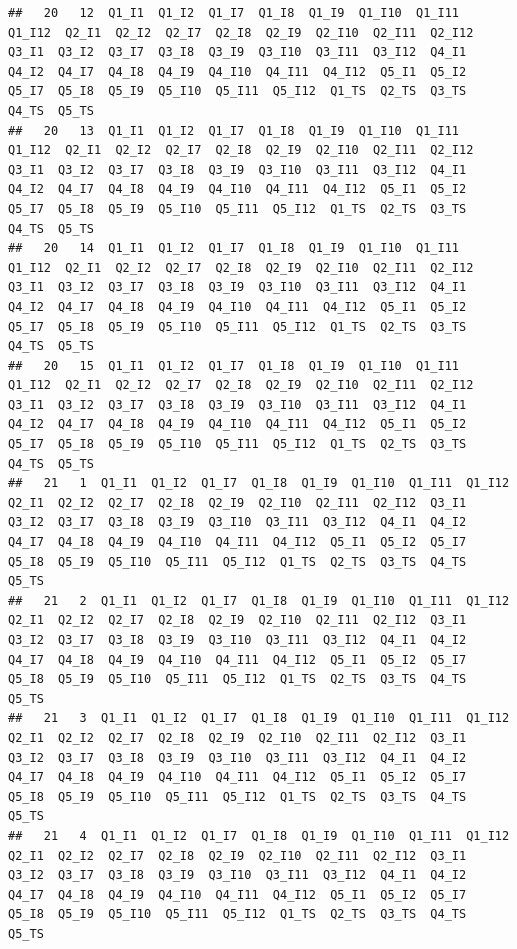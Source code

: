 \documentclass[
]{book}
\begin{document}
\begin{verbatim}
##   20   12  Q1_I1  Q1_I2  Q1_I7  Q1_I8  Q1_I9  Q1_I10  Q1_I11  Q1_I12  Q2_I1  Q2_I2  Q2_I7  Q2_I8  Q2_I9  Q2_I10  Q2_I11  Q2_I12  Q3_I1  Q3_I2  Q3_I7  Q3_I8  Q3_I9  Q3_I10  Q3_I11  Q3_I12  Q4_I1  Q4_I2  Q4_I7  Q4_I8  Q4_I9  Q4_I10  Q4_I11  Q4_I12  Q5_I1  Q5_I2  Q5_I7  Q5_I8  Q5_I9  Q5_I10  Q5_I11  Q5_I12  Q1_TS  Q2_TS  Q3_TS  Q4_TS  Q5_TS
##   20   13  Q1_I1  Q1_I2  Q1_I7  Q1_I8  Q1_I9  Q1_I10  Q1_I11  Q1_I12  Q2_I1  Q2_I2  Q2_I7  Q2_I8  Q2_I9  Q2_I10  Q2_I11  Q2_I12  Q3_I1  Q3_I2  Q3_I7  Q3_I8  Q3_I9  Q3_I10  Q3_I11  Q3_I12  Q4_I1  Q4_I2  Q4_I7  Q4_I8  Q4_I9  Q4_I10  Q4_I11  Q4_I12  Q5_I1  Q5_I2  Q5_I7  Q5_I8  Q5_I9  Q5_I10  Q5_I11  Q5_I12  Q1_TS  Q2_TS  Q3_TS  Q4_TS  Q5_TS
##   20   14  Q1_I1  Q1_I2  Q1_I7  Q1_I8  Q1_I9  Q1_I10  Q1_I11  Q1_I12  Q2_I1  Q2_I2  Q2_I7  Q2_I8  Q2_I9  Q2_I10  Q2_I11  Q2_I12  Q3_I1  Q3_I2  Q3_I7  Q3_I8  Q3_I9  Q3_I10  Q3_I11  Q3_I12  Q4_I1  Q4_I2  Q4_I7  Q4_I8  Q4_I9  Q4_I10  Q4_I11  Q4_I12  Q5_I1  Q5_I2  Q5_I7  Q5_I8  Q5_I9  Q5_I10  Q5_I11  Q5_I12  Q1_TS  Q2_TS  Q3_TS  Q4_TS  Q5_TS
##   20   15  Q1_I1  Q1_I2  Q1_I7  Q1_I8  Q1_I9  Q1_I10  Q1_I11  Q1_I12  Q2_I1  Q2_I2  Q2_I7  Q2_I8  Q2_I9  Q2_I10  Q2_I11  Q2_I12  Q3_I1  Q3_I2  Q3_I7  Q3_I8  Q3_I9  Q3_I10  Q3_I11  Q3_I12  Q4_I1  Q4_I2  Q4_I7  Q4_I8  Q4_I9  Q4_I10  Q4_I11  Q4_I12  Q5_I1  Q5_I2  Q5_I7  Q5_I8  Q5_I9  Q5_I10  Q5_I11  Q5_I12  Q1_TS  Q2_TS  Q3_TS  Q4_TS  Q5_TS
##   21   1  Q1_I1  Q1_I2  Q1_I7  Q1_I8  Q1_I9  Q1_I10  Q1_I11  Q1_I12  Q2_I1  Q2_I2  Q2_I7  Q2_I8  Q2_I9  Q2_I10  Q2_I11  Q2_I12  Q3_I1  Q3_I2  Q3_I7  Q3_I8  Q3_I9  Q3_I10  Q3_I11  Q3_I12  Q4_I1  Q4_I2  Q4_I7  Q4_I8  Q4_I9  Q4_I10  Q4_I11  Q4_I12  Q5_I1  Q5_I2  Q5_I7  Q5_I8  Q5_I9  Q5_I10  Q5_I11  Q5_I12  Q1_TS  Q2_TS  Q3_TS  Q4_TS  Q5_TS
##   21   2  Q1_I1  Q1_I2  Q1_I7  Q1_I8  Q1_I9  Q1_I10  Q1_I11  Q1_I12  Q2_I1  Q2_I2  Q2_I7  Q2_I8  Q2_I9  Q2_I10  Q2_I11  Q2_I12  Q3_I1  Q3_I2  Q3_I7  Q3_I8  Q3_I9  Q3_I10  Q3_I11  Q3_I12  Q4_I1  Q4_I2  Q4_I7  Q4_I8  Q4_I9  Q4_I10  Q4_I11  Q4_I12  Q5_I1  Q5_I2  Q5_I7  Q5_I8  Q5_I9  Q5_I10  Q5_I11  Q5_I12  Q1_TS  Q2_TS  Q3_TS  Q4_TS  Q5_TS
##   21   3  Q1_I1  Q1_I2  Q1_I7  Q1_I8  Q1_I9  Q1_I10  Q1_I11  Q1_I12  Q2_I1  Q2_I2  Q2_I7  Q2_I8  Q2_I9  Q2_I10  Q2_I11  Q2_I12  Q3_I1  Q3_I2  Q3_I7  Q3_I8  Q3_I9  Q3_I10  Q3_I11  Q3_I12  Q4_I1  Q4_I2  Q4_I7  Q4_I8  Q4_I9  Q4_I10  Q4_I11  Q4_I12  Q5_I1  Q5_I2  Q5_I7  Q5_I8  Q5_I9  Q5_I10  Q5_I11  Q5_I12  Q1_TS  Q2_TS  Q3_TS  Q4_TS  Q5_TS
##   21   4  Q1_I1  Q1_I2  Q1_I7  Q1_I8  Q1_I9  Q1_I10  Q1_I11  Q1_I12  Q2_I1  Q2_I2  Q2_I7  Q2_I8  Q2_I9  Q2_I10  Q2_I11  Q2_I12  Q3_I1  Q3_I2  Q3_I7  Q3_I8  Q3_I9  Q3_I10  Q3_I11  Q3_I12  Q4_I1  Q4_I2  Q4_I7  Q4_I8  Q4_I9  Q4_I10  Q4_I11  Q4_I12  Q5_I1  Q5_I2  Q5_I7  Q5_I8  Q5_I9  Q5_I10  Q5_I11  Q5_I12  Q1_TS  Q2_TS  Q3_TS  Q4_TS  Q5_TS

\end{verbatim}
\end{document}

